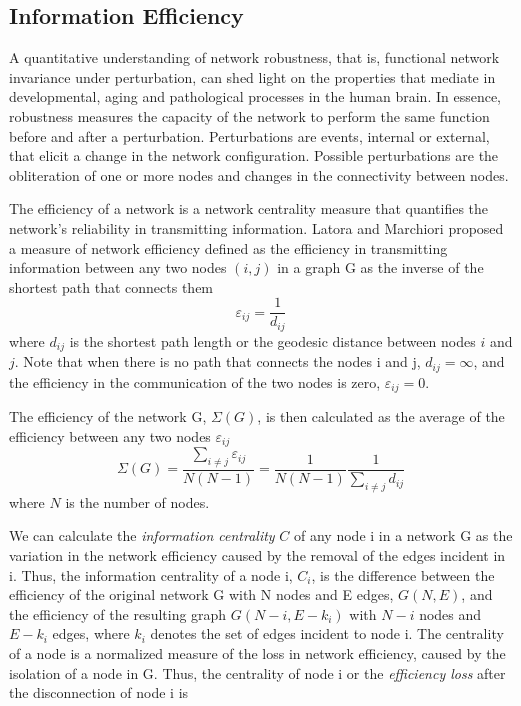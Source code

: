 \documentclass[12pt,a4paper]{article}
\begin{document}
\subsection{Information Efficiency}
\label{ss:nrobeffvul}
A quantitative understanding of network robustness, that is, functional
network invariance under perturbation, can shed light on 
the properties that mediate in developmental, aging and pathological processes
in the human brain. In essence, robustness measures the capacity of the network to
perform the same function before and after a perturbation. Perturbations are
events, internal or external, that elicit a change in the network
configuration. Possible perturbations are the obliteration of one or more nodes and changes in the
connectivity between nodes. 





The efficiency of a network is a network centrality
measure that quantifies the network's reliability in transmitting information. 
Latora and Marchiori \citep{latora_efficient_2001} proposed a measure of network
efficiency defined as the efficiency in transmitting information 
between any two nodes $(i,j)$ in a graph G as the inverse of the shortest path that
connects them
\begin{equation}
\varepsilon_{ij}= \frac{1} {d_{ij}}
\label{eq:geod}
\end{equation}
where $d_{ij}$ is the
shortest path length or the geodesic distance between nodes $i$ and $j$. 
Note that when there is no path that connects the nodes i and j, $d_{ij}=
\infty$, and the efficiency in the communication of the two nodes is zero,
$\varepsilon_{ij}=0$.

The efficiency of the network G, $\Sigma(G)$, is then calculated as the average of the efficiency
between any two nodes $\varepsilon_{ij}$ 
\begin{equation}
\Sigma(G)=\frac{\sum_{i \neq j} \varepsilon_{ij}} {N(N-1)}
=\frac{1}{N(N-1)}\frac{1}{\sum_{i \neq j } d_{ij}}
\label{eq:latm}
\end{equation}
where $N$ is the number of nodes. 
 
We can calculate
the  \emph{information centrality} $C$ 
of any node i in a network G as the variation
in the network efficiency caused by the removal of the edges incident in i. Thus, the
information centrality of a node i, $C_i$, is the difference between the
efficiency of the original network G with N nodes and E edges, $G(N,E)$, and the
efficiency of the resulting graph $G(N-i,E-k_i)$ with $N-i$ nodes and $E-k_i$ edges, where
$k_i$ denotes the set of edges incident to node i. The centrality of a
node is a normalized measure of the loss in network efficiency, caused by the isolation of a node in G. Thus, the centrality of node i or the \emph{efficiency loss} after the disconnection of node i is
\end{document}
